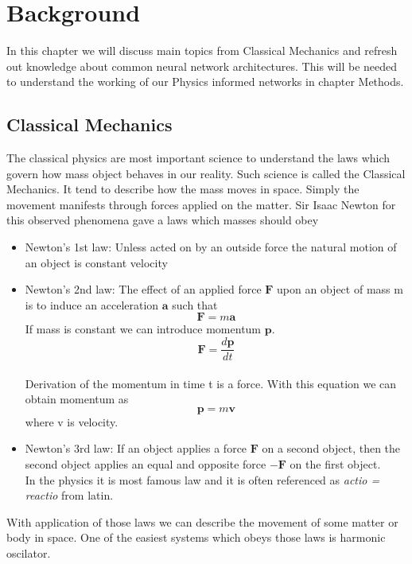 \chapter{Background}
In this chapter we will discuss main topics from Classical Mechanics and refresh out knowledge about common neural network architectures. This will be needed to understand the working of our Physics informed networks in chapter Methods.
 
\section{Classical Mechanics}
The classical physics are most important science to understand the laws which govern how mass object behaves in our reality. Such science is called the Classical Mechanics. It tend to describe how the mass moves in space. Simply the movement manifests through forces applied on the matter. Sir Isaac Newton for this observed phenomena gave a laws which masses should obey  \cite{ClassPhy}
\begin{itemize}
	\item Newton's 1st law: Unless acted on by an outside force the natural motion of an object is constant velocity
	\item Newton’s 2nd law: The effect of an applied force $\mathbf{F}$ upon an object of mass
	m is to induce an acceleration $\mathbf{a}$ such that $$\mathbf{F}=m\mathbf{a}$$
	If mass is constant we can introduce momentum $\mathbf{p}$.
	$$\mathbf{F}=\frac{d\mathbf{p}}{dt}$$ \\
	Derivation of the momentum in time t is a force. 
	With this equation we can obtain momentum as $$\mathbf{p}=m\mathbf{v}$$ where v is velocity.
	\item Newton’s 3rd law: If an object applies a force $\mathbf{F}$ on a second object, then the second object applies an equal and opposite force $-\mathbf{F}$ on the first object.\\
	In the physics it is most famous law and it is often referenced as  \textit{actio = reactio} from latin.
\end{itemize}
With application of  those laws we can describe the movement of some matter or body in space.
One of the easiest systems which obeys those laws is harmonic oscilator.
